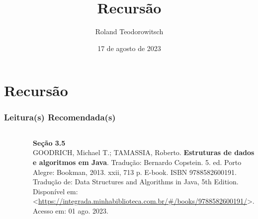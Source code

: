 \documentclass[aspectratio=169]{beamer}
\title[\sc{Recursão}]{Recursão}
\author[Roland Teodorowitsch]{Roland Teodorowitsch}
\institute[ALEST I - EP - PUCRS]{Algoritmos e Estruturas de Dados I - Escola Politécnica - PUCRS}
\date{17 de agosto de 2023}
\begin{document}
\justifying

\begin{frame}
	\titlepage
\end{frame}

\section{Recursão}

\begin{frame}\frametitle{Leitura(s) Recomendada(s)}

\begin{columns}[T]
\begin{column}{0.15\linewidth}
\vspace{-3mm}
\begin{figure}[h]
	\centering
	\includegraphics[height=0.3\paperheight]{imagens/livro_goodrich.jpg}
\end{figure}
\end{column}
\begin{column}{0.85\linewidth}
\vspace{3mm}
\textbf{Seção 3.5}\\
\scriptsize{GOODRICH, Michael T.; TAMASSIA, Roberto. \textbf{Estruturas de dados e algoritmos em Java}. Tradução: Bernardo Copstein. 5. ed. Porto Alegre: Bookman, 2013. xxii, 713 p. E-book. ISBN 9788582600191. Tradução de: Data Structures and Algorithms in Java, 5th Edition. Disponível em: \textless{}\url{https://integrada.minhabiblioteca.com.br/\#/books/9788582600191/}\textgreater{}. Acesso em: 01 ago. 2023.}
\end{column}
\end{columns}

\end{frame}
\end{document}

